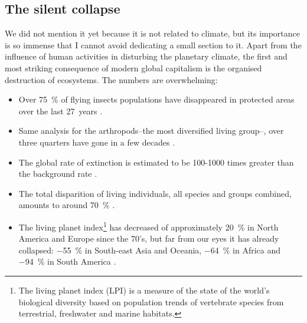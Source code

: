 %
%

\subsection{The silent collapse}
\label{sec:silent_collapse}
We did not mention it yet because it is not related to climate, but its importance is so immense that I cannot avoid dedicating a small section to it.
Apart from the influence of human activities in disturbing the planetary climate, the first and most striking consequence of modern global capitalism is the organised destruction of ecosystems.
The numbers are overwhelming: 
\begin{itemize}
    \item Over \SI{75}{\percent} of flying insects populations have disappeared in protected areas over the last \SI{27}{years} \citep{hallmann_more_2017}.
    \item Same analysis for the arthropods\---the most diversified living group\---, over three quarters have gone in a few decades \citep{seibold_arthropod_2019}.%
    \item The global rate of extinction is estimated to be 100-1000 times greater than the background rate \citep{lamkin_challenge_2016}.
    \item The total disparition of living individuals, all species and groups combined, amounts to around \SI{70}{\percent} \citep{ipbes_summary_2019}.
    \item The living planet index\footnote{The living planet index (LPI) is a measure of the state of the world's biological diversity based on population trends of vertebrate species from terrestrial, freshwater and marine habitats.} has decreased of approximately \SI{20}{\percent} in North America and Europe since the 70's, but far from our eyes it has already collapsed: \SI{-55}{\percent} in South-east Asia and Oceania, \SI{-64}{\percent} in Africa and \SI{-94}{\percent} in South America \citep{ritchie_biodiversity_2022}.
\end{itemize}

